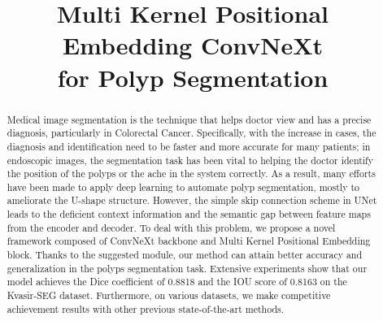 \documentclass[conference]{IEEEtran}
\begin{document}
\title{Multi Kernel Positional Embedding ConvNeXt \\ for Polyp Segmentation}




\author{
} 





















\maketitle
\begin{abstract}
Medical image segmentation is the technique that helps doctor view and has a precise diagnosis, particularly in Colorectal Cancer. Specifically, with the increase in cases, the diagnosis and identification need to be faster and more accurate for many patients; in endoscopic images, the segmentation task has been vital to helping the doctor identify the position of the polyps or the ache in the system correctly. As a result, many efforts have been made to apply deep learning to automate polyp segmentation, mostly to ameliorate the U-shape structure. However, the simple skip connection scheme in UNet leads to the deficient context information and the semantic gap between feature maps from the encoder and decoder. To deal with this problem, we propose a novel framework composed of ConvNeXt backbone and Multi Kernel Positional Embedding block. Thanks to the suggested module, our method can attain better accuracy and generalization in the polyps segmentation task. Extensive experiments show that our model achieves the Dice coefficient of 0.8818 and the IOU score of 0.8163 on the Kvasir-SEG dataset. Furthermore, on various datasets, we make competitive achievement results with other previous state-of-the-art methods.
\end{abstract}
\end{document}
